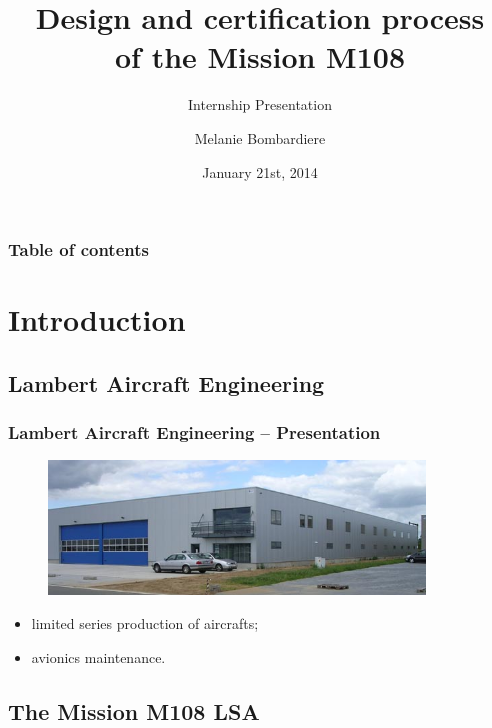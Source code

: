 \documentclass{beamer}
\begin{document}
\subtitle{Internship Presentation}

\title{Design and certification process\\ of the Mission M108}

\author{Melanie Bombardiere}

\date{January 21st, 2014}

\begin{frame}
  \titlepage
\end{frame}

\begin{frame}\frametitle{Table of contents}\tableofcontents
\end{frame}

\section{Introduction}

\subsection{Lambert Aircraft Engineering}

\begin{frame}\frametitle{Lambert Aircraft Engineering -- Presentation}
\begin{figure}[ht!]
	\begin{center}
		\includegraphics[width=10cm]{pics/PIC001.jpg}
		\label{fig:LAE}
	\end{center}
\end{figure}

\begin{itemize}
    \item limited series production of aircrafts;
    \item avionics maintenance.
  \end{itemize}
\end{frame}

\subsection{The Mission M108 LSA}
\end{document}
